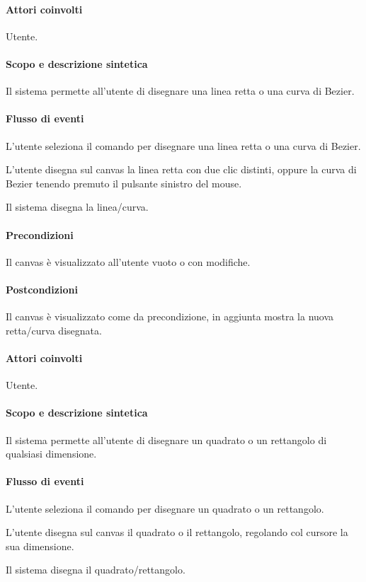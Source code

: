 \paragraph{Attori coinvolti} Utente.
\paragraph{Scopo e descrizione sintetica} 
Il sistema permette all'utente di disegnare una linea retta o una curva di Bezier.
\paragraph{Flusso di eventi}
\begin{elenconumerato}[\textbf{}]{\subsubsecindent}
\item L'utente seleziona il comando per disegnare una linea retta o una curva di Bezier.
\item L'utente disegna sul canvas la linea retta con due clic distinti, oppure la curva di Bezier tenendo premuto il pulsante sinistro del mouse.
\item Il sistema disegna la linea/curva.
\end{elenconumerato}
\paragraph{Precondizioni} Il canvas \`e visualizzato all'utente vuoto o con modifiche.
\paragraph{Postcondizioni} Il canvas \`e visualizzato come da precondizione, in aggiunta mostra la nuova retta/curva disegnata.

\paragraph{Attori coinvolti} Utente.
\paragraph{Scopo e descrizione sintetica} 
Il sistema permette all'utente di disegnare un quadrato o un rettangolo di qualsiasi dimensione.
\paragraph{Flusso di eventi}
\begin{elenconumerato}[\textbf{}]{\subsubsecindent}
\item L'utente seleziona il comando per disegnare un quadrato o un rettangolo.
\item L'utente disegna sul canvas il quadrato o il rettangolo, regolando col cursore la sua dimensione.
\item Il sistema disegna il quadrato/rettangolo.
\end{elenconumerato}
